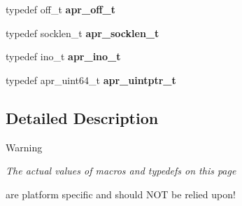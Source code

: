 \begin{DoxyCompactItemize}
\item 
\hypertarget{group__apr__platform_ga6938af9075cec15c88299109381aa984}{typedef off\-\_\-t {\bfseries apr\-\_\-off\-\_\-t}}\label{group__apr__platform_ga6938af9075cec15c88299109381aa984}

\item 
\hypertarget{group__apr__platform_gab613b0701b7a8b0ccd1a3c157a800f27}{typedef socklen\-\_\-t {\bfseries apr\-\_\-socklen\-\_\-t}}\label{group__apr__platform_gab613b0701b7a8b0ccd1a3c157a800f27}

\item 
\hypertarget{group__apr__platform_ga0a5ae63884288a9f69f4e384a23bad68}{typedef ino\-\_\-t {\bfseries apr\-\_\-ino\-\_\-t}}\label{group__apr__platform_ga0a5ae63884288a9f69f4e384a23bad68}

\item 
\hypertarget{group__apr__platform_gabf3268b941400de57926ee0f0ca56aa2}{typedef apr\-\_\-uint64\-\_\-t {\bfseries apr\-\_\-uintptr\-\_\-t}}\label{group__apr__platform_gabf3268b941400de57926ee0f0ca56aa2}

\end{DoxyCompactItemize}


\subsection{Detailed Description}
\begin{DoxyWarning}{Warning}
{\bfseries {\itshape The actual values of macros and typedefs on this page\par
 are platform specific and should N\-O\-T be relied upon!}} 
\end{DoxyWarning}


